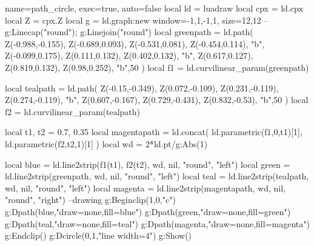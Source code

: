 \documentclass{standalone}%
\begin{document}
\begin{luadraw}{name=path_circle, exec=true, auto=false}
local ld = luadraw
local cpx = ld.cpx
local Z = cpx.Z
local g = ld.graph:new{ window={-1,1,-1,1}, size={12,12} }
-- g:Linecap("round"); g:Linejoin("round")
local greenpath = ld.path( {Z(-0.988,-0.155), Z(-0.689,0.093), Z(-0.531,0.081), Z(-0.454,0.114), "b", Z(-0.099,0.175), Z(0.111,0.132), Z(0.402,0.132), "b", Z(0.617,0.127), Z(0.819,0.132), Z(0.98,0.252), "b"},50 )
local f1 = ld.curvilinear_param(greenpath)

local tealpath = ld.path( {Z(-0.15,-0.349), Z(0.072,-0.109), Z(0.231,-0.119), Z(0.274,-0.119), "b", Z(0.607,-0.167), Z(0.729,-0.431), Z(0.832,-0.53), "b"},50 )
local f2 = ld.curvilinear_param(tealpath)  

local t1, t2 = 0.7, 0.35
local magentapath = ld.concat( ld.parametric(f1,0,t1)[1], ld.parametric(f2,t2,1)[1] )
local wd = 2*ld.pt/g:Abs(1)

local blue = ld.line2strip({f1(t1), f2(t2)}, wd, nil, "round", "left")
local green = ld.line2strip(greenpath, wd, nil, "round", "left")
local teal = ld.line2strip(tealpath, wd, nil, "round", "left")
local magenta = ld.line2strip(magentapath, wd, nil, "round", "right")
--drawing
g:Beginclip({1,0,"c"})
    g:Dpath(blue,"draw=none,fill=blue")
    g:Dpath(green,"draw=none,fill=green")
    g:Dpath(teal,"draw=none,fill=teal")
    g:Dpath(magenta,"draw=none,fill=magenta")
g:Endclip()
g:Dcircle(0,1,"line width=4")
g:Show()
\end{luadraw}
\end{document}
